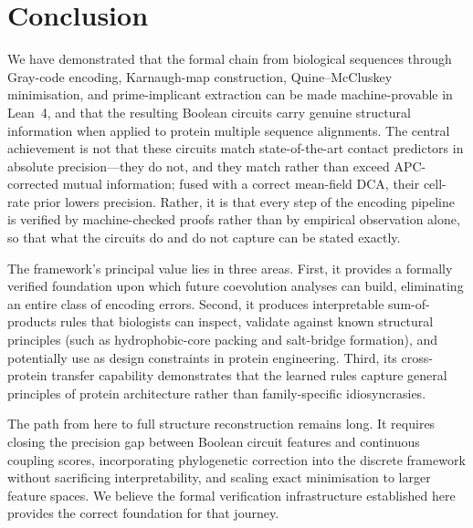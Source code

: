\section{Conclusion}
\label{sec:conclusion}

We have demonstrated that the formal chain from biological sequences through
Gray-code encoding, Karnaugh-map construction, Quine--McCluskey minimisation,
and prime-implicant extraction can be made machine-provable in Lean~4, and
that the resulting Boolean circuits carry genuine structural information when
applied to protein multiple sequence alignments.  The central achievement is
not that these circuits match state-of-the-art contact predictors in absolute
precision---they do not, and they match rather than exceed APC-corrected
mutual information; fused with a correct mean-field DCA, their cell-rate
prior lowers precision.  Rather, it is that every step of the encoding
pipeline is verified by machine-checked proofs rather than by empirical
observation alone, so that what the circuits do and do not capture can be
stated exactly.

The framework's principal value lies in three areas.  First, it provides a
formally verified foundation upon which future coevolution analyses can build,
eliminating an entire class of encoding errors.  Second, it produces
interpretable sum-of-products rules that biologists can inspect, validate
against known structural principles (such as hydrophobic-core packing and
salt-bridge formation), and potentially use as design constraints in protein
engineering.  Third, its cross-protein transfer capability demonstrates that
the learned rules capture general principles of protein architecture rather
than family-specific idiosyncrasies.

The path from here to full structure reconstruction remains long.  It requires
closing the precision gap between Boolean circuit features and continuous
coupling scores, incorporating phylogenetic correction into the discrete
framework without sacrificing interpretability, and scaling exact minimisation
to larger feature spaces.  We believe the formal verification infrastructure
established here provides the correct foundation for that journey.
